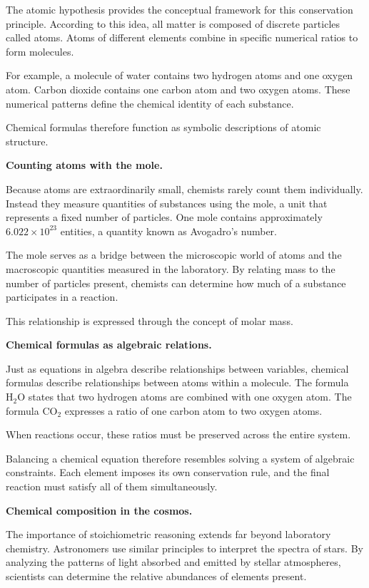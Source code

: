 \documentclass[11pt, openany]{book}
\theoremstyle{plain}
\theoremstyle{definition}
\theoremstyle{remark}
\begin{document}
The atomic hypothesis provides the conceptual framework for this
conservation principle. According to this idea, all matter is composed of
discrete particles called atoms. Atoms of different elements combine in
specific numerical ratios to form molecules.

For example, a molecule of water contains two hydrogen atoms and one
oxygen atom. Carbon dioxide contains one carbon atom and two oxygen
atoms. These numerical patterns define the chemical identity of each
substance.

Chemical formulas therefore function as symbolic descriptions of atomic
structure.

\medskip

\textbf{Counting atoms with the mole.}

Because atoms are extraordinarily small, chemists rarely count them
individually. Instead they measure quantities of substances using the
mole, a unit that represents a fixed number of particles. One mole
contains approximately $6.022\times10^{23}$ entities, a quantity known
as Avogadro's number.

The mole serves as a bridge between the microscopic world of atoms and
the macroscopic quantities measured in the laboratory. By relating mass
to the number of particles present, chemists can determine how much of a
substance participates in a reaction.

This relationship is expressed through the concept of molar mass.

\medskip

\textbf{Chemical formulas as algebraic relations.}

Just as equations in algebra describe relationships between variables,
chemical formulas describe relationships between atoms within a
molecule. The formula $\mathrm{H_2O}$ states that two hydrogen atoms are
combined with one oxygen atom. The formula $\mathrm{CO_2}$ expresses a
ratio of one carbon atom to two oxygen atoms.

When reactions occur, these ratios must be preserved across the entire
system.

Balancing a chemical equation therefore resembles solving a system of
algebraic constraints. Each element imposes its own conservation rule,
and the final reaction must satisfy all of them simultaneously.

\medskip

\textbf{Chemical composition in the cosmos.}

The importance of stoichiometric reasoning extends far beyond laboratory
chemistry. Astronomers use similar principles to interpret the spectra
of stars. By analyzing the patterns of light absorbed and emitted by
stellar atmospheres, scientists can determine the relative abundances of
elements present.
\end{document}
